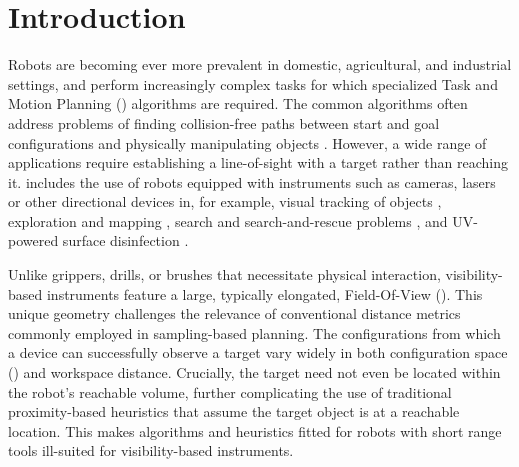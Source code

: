\section{Introduction}
\label{sec:intro}






Robots are becoming ever more prevalent in domestic, agricultural, and industrial settings, and perform increasingly complex tasks for which specialized Task and Motion Planning (\tamp) algorithms are required. The common \tamp algorithms often address problems of finding collision-free paths between start and goal configurations and physically manipulating objects \cite{gchkskl-itamp-21}. However, a wide range of applications require establishing a line-of-sight with a target rather than reaching it.  includes the use of robots equipped with instruments such as cameras, lasers or other directional devices in, for example, visual tracking of objects \cite{ch-vsvt-08}, exploration and mapping \cite{lla-amres-21}, search and search-and-rescue problems \cite{st-vso3deumr-10}%
, and UV-powered surface disinfection \cite{mhtls-ubdrr-23}. 

Unlike grippers, drills, or brushes that necessitate physical interaction, visibility-based instruments feature a large, typically elongated, Field-Of-View (\fov). This unique geometry challenges the relevance of conventional distance metrics commonly employed in sampling-based planning. The configurations from which a device can successfully observe a target vary widely in both configuration space (\cspace) and workspace distance. Crucially, the target need not even be located within the robot's reachable volume, further complicating the use of traditional proximity-based heuristics that assume the target object is at a reachable location. This makes algorithms and heuristics fitted for robots with short range tools ill-suited for visibility-based instruments.

